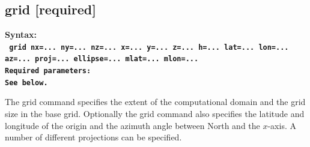 \documentclass[11pt]{report}
\begin{document}
\subsection{grid [required]}
\label{keyword:grid}
\begin{flushleft}
\bf Syntax:\\
\tt
grid nx=...  ny=...  nz=...
x=... y=... z=... h=... lat=... lon=... az=... proj=... ellipse=... mlat=... mlon=...\\
\bf Required parameters:\\
\rm See below.
\end{flushleft}
The grid command specifies the extent of the computational domain and the grid size in the base
grid. Optionally the grid command also specifies the latitude and longitude of the origin and the
azimuth angle between North and the $x$-axis. A number of different projections can be specified.
\end{document}
